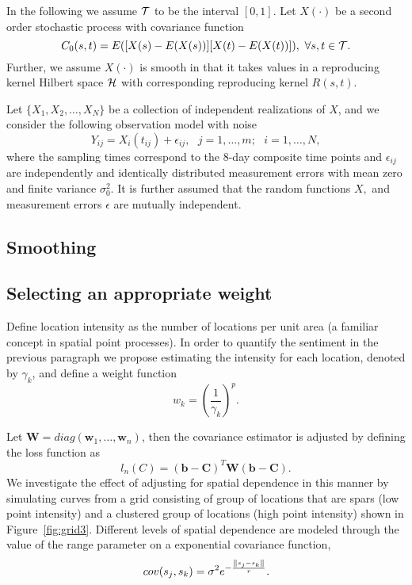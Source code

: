 \label{sec:methodology}

In the following we assume $\mathcal{T}$ to be the interval $[0,1]$. Let $X(\cdot)$ be a second order stochastic process with covariance function
\[ C_{0}(s,t)=E([X(s)-E(X(s))][X(t)-E(X(t))]),\mbox{ }\forall s,t\in \mathcal{T}. \]
Further, we assume $X(\cdot)$ is smooth in that it takes values in a reproducing kernel Hilbert space $\mathcal{H}$ with corresponding reproducing kernel $R(s,t)$. 

Let $\{X_{1},X_{2},\dots,X_{N}\}$ be a collection of independent realizations of $X$, and we consider the following observation model with noise
\[ Y_{ij}=X_{i}(t_{ij})+\epsilon_{ij},\mbox{ }j=1,\dots,m;\mbox{ }i=1,\dots,N, \]
where the sampling times correspond to the 8-day composite time points and $\epsilon_{ij}$ are independently and identically distributed measurement errors with mean zero and finite variance $\sigma_{0}^{2}.$ It is further assumed that the random functions $X,$ and measurement errors $\epsilon$ are mutually independent. 

\subsection{Smoothing} 

\label{sub:smoothing}

\subsection{Selecting an appropriate weight} 

\label{sub:selecting_an_appropriate_weight} Define location intensity as the number of locations per unit area (a familiar concept in spatial point processes). In order to quantify the sentiment in the previous paragraph we propose estimating the intensity for each location, denoted by $\gamma_k$, and define a weight function 
\begin{equation}
	w_k = \left(\frac{1}{\gamma_k}\right)^p. 
\end{equation}

Let $\mathbf{W} = diag(\mathbf{w}_1, \dots, \mathbf{w}_n)$, then the covariance estimator is adjusted by defining the loss function as 
\begin{equation}
	l_{n}(C)= (\mathbf{b} - \mathbf{C})^T\mathbf{W}(\mathbf{b} - \mathbf{C}). \label{eq:diag weighted loss function} 
\end{equation}
We investigate the effect of adjusting for spatial dependence in this manner by simulating curves from a grid consisting of group of locations that are spars (low point intensity) and a clustered group of locations (high point intensity) shown in Figure~\ref{fig:grid3}. Different levels of spatial dependence are modeled through the value of the range parameter on a exponential covariance function, 
\begin{equation}
	cov(s_j, s_k) = \sigma^2e^{-\frac{\left\|s_j - s_k\right\|}{r}}. 
\end{equation}

